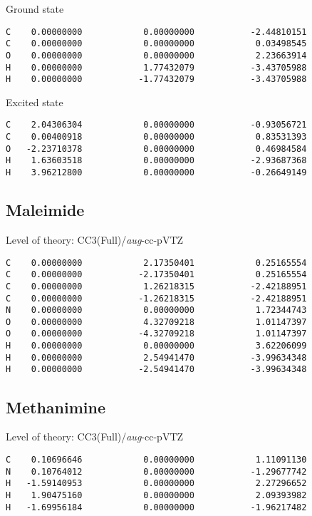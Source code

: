 \documentclass[journal=jctcce,manuscript=article,layout=traditional]{achemso}
\newcommand{\AVTZ}{\emph{aug}-cc-pVTZ}
\begin{document}
\begin{singlespace}
\noindent Ground state
\begin{verbatim}
C    0.00000000            0.00000000           -2.44810151
C    0.00000000            0.00000000            0.03498545
O    0.00000000            0.00000000            2.23663914
H    0.00000000            1.77432079           -3.43705988
H    0.00000000           -1.77432079           -3.43705988
\end{verbatim}
\end{singlespace}

\begin{singlespace}
\noindent Excited state
\begin{verbatim}
C    2.04306304            0.00000000           -0.93056721
C    0.00400918            0.00000000            0.83531393
O   -2.23710378            0.00000000            0.46984584
H    1.63603518            0.00000000           -2.93687368
H    3.96212800            0.00000000           -0.26649149
\end{verbatim}
\end{singlespace}

\subsection*{Maleimide}

\begin{singlespace}
Level of theory: CC3(Full)/{\AVTZ}
\begin{verbatim}
C    0.00000000            2.17350401            0.25165554
C    0.00000000           -2.17350401            0.25165554
C    0.00000000            1.26218315           -2.42188951
C    0.00000000           -1.26218315           -2.42188951
N    0.00000000            0.00000000            1.72344743
O    0.00000000            4.32709218            1.01147397
O    0.00000000           -4.32709218            1.01147397
H    0.00000000            0.00000000            3.62206099
H    0.00000000            2.54941470           -3.99634348
H    0.00000000           -2.54941470           -3.99634348
\end{verbatim}
\end{singlespace}

\subsection*{Methanimine}

\begin{singlespace}
Level of theory: CC3(Full)/{\AVTZ}
\begin{verbatim}
C    0.10696646            0.00000000            1.11091130
N    0.10764012            0.00000000           -1.29677742
H   -1.59140953            0.00000000            2.27296652
H    1.90475160            0.00000000            2.09393982
H   -1.69956184            0.00000000           -1.96217482    
\end{verbatim}
\end{singlespace}
\end{document}
